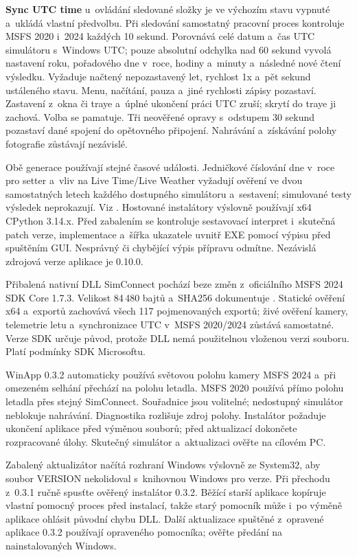 \documentclass[11pt,a4paper]{article}
\newcommand{\filepath}[1]{\path{#1}}
\newcommand{\ui}[1]{\textbf{#1}}
\begin{document}
\ui{Sync UTC time} u~ovládání sledované složky je ve výchozím stavu vypnuté
a~ukládá vlastní předvolbu. Při sledování samostatný pracovní proces kontroluje
MSFS 2020 i~2024 každých 10 sekund. Porovnává celé datum a~čas UTC simulátoru
s~Windows UTC; pouze absolutní odchylka nad 60 sekund vyvolá nastavení roku,
pořadového dne v~roce, hodiny a~minuty a~následné nové čtení výsledku.
Vyžaduje načtený nepozastavený let, rychlost 1x a~pět sekund ustáleného stavu.
Menu, načítání, pauza a~jiné rychlosti zápisy pozastaví. Zastavení z~okna či
traye
a~úplné ukončení práci UTC zruší; skrytí do traye ji zachová. Volba se pamatuje.
Tři neověřené opravy s~odstupem 30 sekund pozastaví dané spojení do opětovného
připojení. Nahrávání a~získávání polohy fotografie zůstávají nezávislé.

Obě generace používají stejné časové události. Jedničkové číslování dne v~roce
pro setter a~vliv na Live Time/Live Weather vyžadují ověření ve dvou
samostatných
letech každého dostupného simulátoru a~sestavení; simulované testy výsledek
neprokazují. Viz \filepath{winapp/README.md}. Hostované instalátory výslovně
používají x64 CPython 3.14.x. Před zabalením se kontroluje sestavovací interpret
i~skutečná patch verze, implementace a~šířka ukazatele uvnitř EXE pomocí výpisu
před spuštěním GUI. Nesprávný či chybějící výpis přípravu odmítne. Nezávislá
zdrojová verze aplikace je 0.10.0.

Přibalená nativní DLL SimConnect pochází beze změn z~oficiálního
MSFS 2024 SDK Core 1.7.3. Velikost 84\,480 bajtů a~SHA256 dokumentuje
\filepath{winapp/README.md}. Statické ověření x64 a~exportů zachovává
všech 117 pojmenovaných exportů; živé ověření kamery, telemetrie letu
a~synchronizace UTC v~MSFS 2020/2024 zůstává samostatné. Verze SDK určuje
původ, protože DLL nemá použitelnou vloženou verzi souboru. Platí podmínky SDK
Microsoftu.

WinApp 0.3.2 automaticky používá světovou polohu kamery MSFS 2024 a~při omezeném
selhání přechází na polohu letadla. MSFS 2020 používá přímo polohu letadla přes
stejný SimConnect. Souřadnice jsou volitelné; nedostupný simulátor neblokuje
nahrávání. Diagnostika rozlišuje zdroj polohy. Instalátor požaduje ukončení
aplikace před výměnou souborů; před aktualizací dokončete rozpracované úlohy.
Skutečný simulátor a~aktualizaci ověřte na cílovém PC.

Zabalený aktualizátor načítá rozhraní Windows výslovně ze System32, aby soubor
VERSION nekolidoval s~knihovnou Windows pro verze. Při přechodu z~0.3.1 ručně
spusťte ověřený instalátor 0.3.2. Běžící starší aplikace kopíruje vlastní
pomocný proces před instalací, takže starý pomocník může i~po výměně aplikace
ohlásit původní chybu DLL. Další aktualizace spuštěné z~opravené aplikace 0.3.2
používají opraveného pomocníka; ověřte předání na nainstalovaných Windows.
\end{document}

